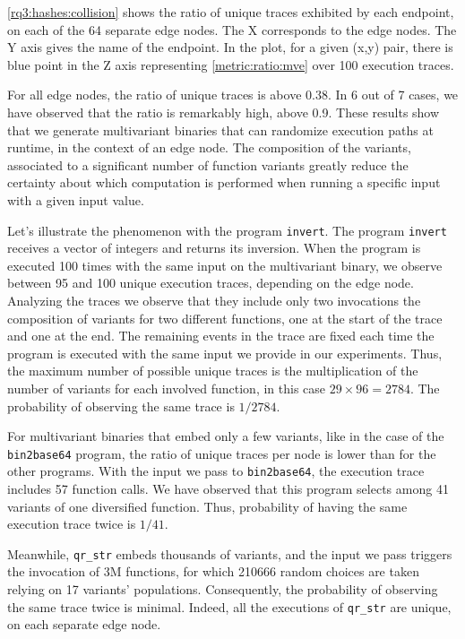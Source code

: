 \autoref{rq3:hashes:collision} shows the ratio of unique traces exhibited by each endpoint, on each of the 64 separate edge nodes. 
The X corresponds to the edge nodes.
The Y axis gives the name of the endpoint.
In the plot, for a given (x,y) pair, there is blue point in the Z axis representing \autoref{metric:ratio:mve} over 100 execution traces.

For all edge nodes, the ratio of unique traces is above 0.38.
In 6 out of 7 cases, we have observed that the ratio is remarkably high, above 0.9.
These results show that we generate multivariant binaries that can randomize execution paths at runtime, in the context of an edge node. The composition of the variants, associated to a significant number of function variants greatly reduce the certainty about which computation is performed when running a specific input with a given input value.

Let's illustrate the phenomenon with the program \texttt{invert}.
The program \texttt{invert} receives a vector of integers and returns its inversion.
When the program is executed 100 times with the same input on the multivariant binary, we observe between 95 and 100 unique execution traces, depending on the edge node.
Analyzing the traces we observe that they include only two invocations the composition of variants for two different functions, one at the start of the trace and one at the end.
The remaining events in the trace are fixed each time the program is executed with the same input we provide in our experiments.
Thus, the maximum number of possible unique traces is the multiplication of the number of variants for each involved function, in this case $29\times96=2784$. The probability of observing the same trace is $1/2784$.


For multivariant binaries that embed only a few variants, like in the case of the \texttt{bin2base64} program, the ratio of unique traces per node is lower than for the other programs.
With the input we pass to \texttt{bin2base64}, the execution trace includes 57 function calls.
We have observed that this program selects among 41 variants of one diversified function. Thus,  probability of having the same execution trace  twice is $1/41$. 

Meanwhile, \texttt{qr\_str} embeds thousands of variants, and the input we pass triggers the invocation of 3M functions, for which 210666 random choices are taken relying on 17 variants' populations. Consequently, the probability of observing the same trace twice is minimal. Indeed, all the executions of \texttt{qr\_str} are unique, on each separate edge node.


